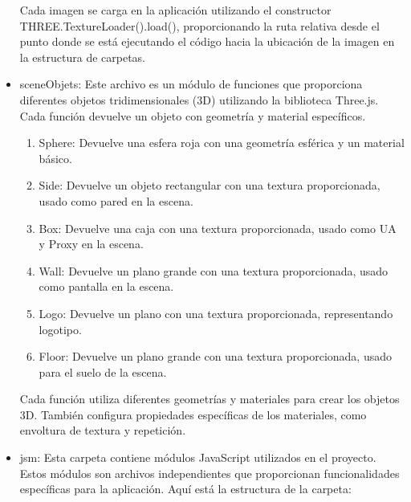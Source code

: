 \documentclass[a4paper, 12pt]{book}
\begin{document}
\begin{itemize}
  Cada imagen se carga en la aplicación utilizando el constructor THREE.TextureLoader().load(), 
  proporcionando la ruta relativa desde el punto donde se está ejecutando el código hacia la ubicación de la imagen en la estructura de carpetas.

  \item sceneObjets: Este archivo es un módulo de funciones que proporciona diferentes objetos tridimensionales (3D) utilizando la biblioteca Three.js. 
  Cada función devuelve un objeto con geometría y material específicos.

  \begin{enumerate}
    \item Sphere: Devuelve una esfera roja con una geometría esférica y un material básico.
    \item Side: Devuelve un objeto rectangular con una textura proporcionada, usado como pared en la escena.
    \item Box: Devuelve una caja con una textura proporcionada, usado como UA y Proxy en la escena.
    \item Wall: Devuelve un plano grande con una textura proporcionada, usado como pantalla en la escena.
    \item Logo: Devuelve un plano con una textura proporcionada, representando logotipo.
    \item Floor: Devuelve un plano grande con una textura proporcionada, usado para el suelo de la escena.
  \end{enumerate}

  Cada función utiliza diferentes geometrías y materiales para crear los objetos 3D. 
  También configura propiedades específicas de los materiales, como envoltura de textura y repetición.
  
  \item jsm: Esta carpeta contiene módulos JavaScript utilizados en el proyecto. Estos módulos son archivos independientes que proporcionan funcionalidades específicas para la aplicación. 
  Aquí está la estructura de la carpeta:


\end{itemize}
\end{document}
